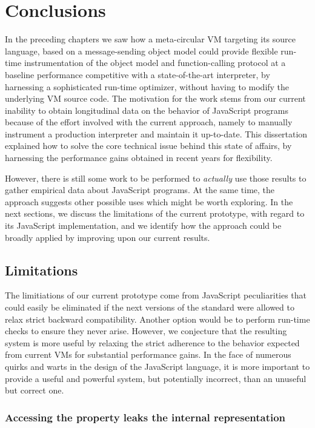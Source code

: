 \chapter{Conclusions}

In the preceding chapters we saw how a meta-circular VM targeting its source
language, based on a message-sending object model could provide flexible
run-time instrumentation of the object model and function-calling protocol at a
baseline performance competitive with a state-of-the-art interpreter, by
harnessing a sophisticated run-time optimizer, without having to modify the
underlying VM source code. The motivation for the work stems from our current
inability to obtain longitudinal data on the behavior of JavaScript programs
because of the effort involved with the current approach, namely to manually
instrument a production interpreter and maintain it up-to-date. This
dissertation explained how to solve the core technical issue behind this state
of affairs, by harnessing the performance gains obtained in recent years for
flexibility.

However, there is still some work to be performed to \textit{actually} use
those results to gather empirical data about JavaScript programs. At the same
time, the approach suggests other possible uses which might be worth exploring.
In the next sections, we discuss the limitations of the current prototype, with
regard to its JavaScript implementation, and we identify how the approach could
be broadly applied by improving upon our current results.

\section{Limitations}

The limitiations of our current prototype come from JavaScript peculiarities
that could easily be eliminated if the next versions of the standard were
allowed to relax strict backward compatibility. Another option would be
to perform run-time checks to ensure they never arise.  However, we conjecture
that the resulting system is more useful by relaxing the strict adherence to
the behavior expected from current VMs for substantial performance gains.  In
the face of numerous quirks and warts in the design of the JavaScript language,
it is more important to provide a useful and powerful system, but potentially
incorrect, than an unuseful but correct one.

\subsection{Accessing the  property leaks the internal representation}

